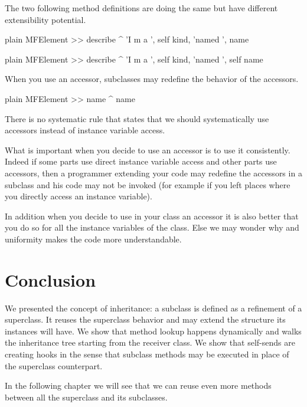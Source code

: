 \documentclass[10pt,twoside,english]{_support/latex/sbabook/sbabook}
\begin{document}
The two following method definitions are doing the same but have different extensibility potential.

\begin{displaycode}{plain}
MFElement >> describe
	^ 'I m a ', self kind, 'named ', name  
\end{displaycode}

\begin{displaycode}{plain}
MFElement >> describe
	^ 'I m a ', self kind, 'named ', self name  
\end{displaycode}

When you use an accessor, subclasses may redefine the behavior of the accessors.

\begin{displaycode}{plain}
MFElement >> name
	^ name
\end{displaycode}

There is no systematic rule that states that we should systematically use accessors instead of instance variable access. 

What is important when you decide to use an accessor is to use it consistently. Indeed 
if some parts use direct instance variable access and other parts use accessors, then a programmer extending your code may redefine the accessors in a subclass and his code may not be invoked (for example if you left places where you directly access an instance variable).

In addition when you decide to use in your class an accessor it is also better that you do so for all the instance variables of the class. Else we may wonder why and uniformity makes the code more understandable.
\section{Conclusion}
We presented the concept of inheritance: a subclass is defined as a refinement of a superclass. It reuses the superclass behavior and may extend the structure its instances will have. We show that method lookup happens dynamically and walks the inheritance tree starting from the receiver class.
We show that self-sends are creating hooks in the sense that subclass methods may be executed in place of the superclass counterpart. 

In the following chapter we will see that we can reuse even more methods between all the superclass and its subclasses.


\backmatter



\end{document}
